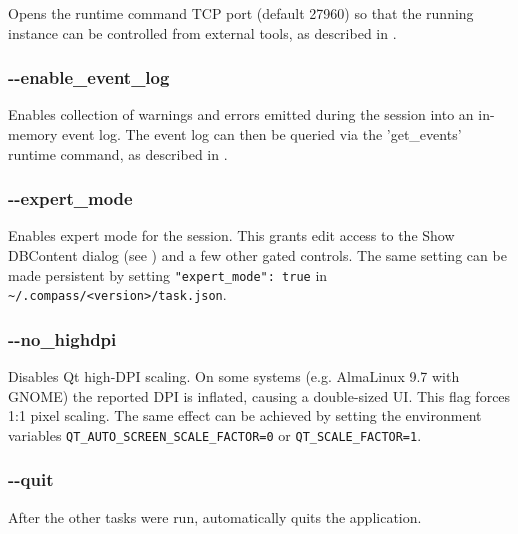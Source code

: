 Opens the runtime command TCP port (default 27960) so that the running instance can be controlled from external tools, as described in .

\subsubsection{-{}-enable\_event\_log}

Enables collection of warnings and errors emitted during the session into an in-memory event log. The event log can then be queried via the 'get\_events' runtime command, as described in .

\subsubsection{-{}-expert\_mode}

Enables expert mode for the session. This grants edit access to the Show DBContent dialog (see ) and a few other gated controls. The same setting can be made persistent by setting \texttt{"expert\_mode": true} in \texttt{\textasciitilde/.compass/<version>/task.json}.

\subsubsection{-{}-no\_highdpi}

Disables Qt high-DPI scaling. On some systems (e.g. AlmaLinux 9.7 with GNOME) the reported DPI is inflated, causing a double-sized UI. This flag forces 1:1 pixel scaling. The same effect can be achieved by setting the environment variables \texttt{QT\_AUTO\_SCREEN\_SCALE\_FACTOR=0} or \texttt{QT\_SCALE\_FACTOR=1}.

\subsubsection{-{}-quit}

After the other tasks were run, automatically quits the application.

